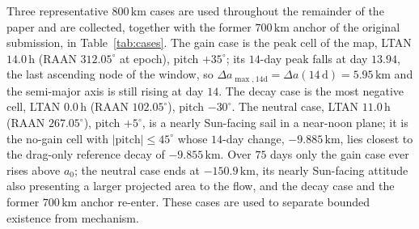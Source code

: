 \vspace{5pt}
\par\noindent Three representative \(800\,\mathrm{km}\) cases are used throughout the remainder of the paper and are collected, together with the former \(700\,\mathrm{km}\) anchor of the original submission, in Table~\ref{tab:cases}. The gain case is the peak cell of the map, LTAN \(14.0\,\mathrm{h}\) (RAAN \(312.05^\circ\) at epoch), pitch \(+35^\circ\); its \(14\)-day peak falls at day \(13.94\), the last ascending node of the window, so \(\Delta a_{\max,14\mathrm{d}} = \Delta a(14\,\mathrm{d}) = 5.95\,\mathrm{km}\) and the semi-major axis is still rising at day \(14\). The decay case is the most negative cell, LTAN \(0.0\,\mathrm{h}\) (RAAN \(102.05^\circ\)), pitch \(-30^\circ\). The neutral case, LTAN \(11.0\,\mathrm{h}\) (RAAN \(267.05^\circ\)), pitch \(+5^\circ\), is a nearly Sun-facing sail in a near-noon plane; it is the no-gain cell with \(|\mathrm{pitch}| \le 45^\circ\) whose \(14\)-day change, \(-9.885\,\mathrm{km}\), lies closest to the drag-only reference decay of \(-9.855\,\mathrm{km}\). Over \(75\) days only the gain case ever rises above \(a_0\); the neutral case ends at \(-150.9\,\mathrm{km}\), its nearly Sun-facing attitude also presenting a larger projected area to the flow, and the decay case and the former \(700\,\mathrm{km}\) anchor re-enter. These cases are used to separate bounded existence from mechanism.

